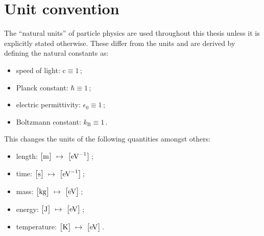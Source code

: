 \section*{Unit convention}

The ``natural units'' of particle physics are used throughout this thesis unless it is explicitly stated otherwise. These differ from the  units and are derived by defining the natural constants as:

\begin{itemize}
\item speed of light: $\mathrm{c}\equiv 1$\,;
\item Planck constant: $\hbar\equiv 1$\,;
\item electric permittivity: $\epsilon_{0}\equiv 1$\,;
\item Boltzmann constant: $k_\mathrm{B}\equiv 1$\,.
\end{itemize}

This changes the units of the following quantities amongst others:

\begin{itemize}
\item length: $\big[\mathrm{m}\big]~\mapsto~ \big[\textrm{eV}^{-1}\big]$\,;
\item time: $\big[\mathrm{s}\big]~\mapsto~ \big[\textrm{eV}^{-1}\big]$\,;
\item mass: $\big[\mathrm{kg}\big]~\mapsto~ \big[\textrm{eV}\big]$\,;
\item energy: $\big[\mathrm{J}\big]~\mapsto~ \big[\textrm{eV}\big]$\,;
\item temperature: $\big[\mathrm{K}\big]~\mapsto~ \big[\textrm{eV}\big]$\,.
\end{itemize}




